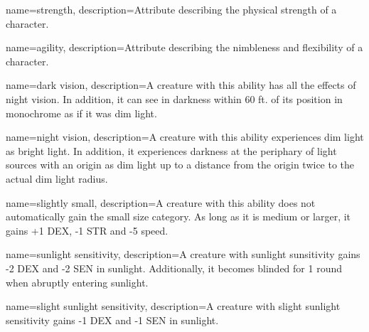 {
    name=strength,
    description={Attribute describing the physical strength of a character.}
}

{
    name=agility,
    description={Attribute describing the nimbleness and flexibility of a
        character.}
}

{
    name={dark vision},
    description={A creature with this ability has all the effects of night
        vision. In addition, it can see in darkness within 60 ft. of its
        position in monochrome as if it was dim light.}
}

{
    name={night vision},
    description={A creature with this ability experiences dim light as bright
        light. In addition, it experiences darkness at the periphary of light
        sources with an origin as dim light up to a distance from the origin 
        twice to the actual dim light radius.}
}

{
    name={slightly small},
    description={A creature with this ability does not automatically gain the
        small size category. As long as it is medium or larger, it gains +1
        DEX, -1 STR and -5 speed.}
}

{
    name={sunlight sensitivity},
    description={A creature with sunlight sunsitivity gains -2 DEX and -2 SEN
        in sunlight. Additionally, it becomes blinded for 1 round when abruptly
        entering sunlight.}
}

{
    name={slight sunlight sensitivity},
    description={A creature with slight sunlight sensitivity gains -1 DEX and
        -1 SEN in sunlight.}
}

